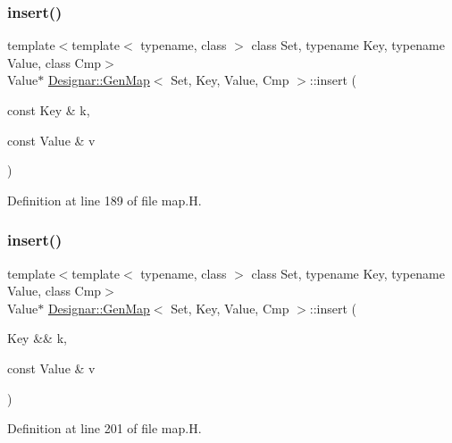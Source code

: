 \subsubsection{\texorpdfstring{insert()}{insert()}\hspace{0.1cm}{\footnotesize\ttfamily [1/4]}}
{\footnotesize\ttfamily template$<$template$<$ typename, class $>$ class Set, typename Key, typename Value, class Cmp$>$ \\
Value$\ast$ \hyperlink{class_designar_1_1_gen_map}{Designar\+::\+Gen\+Map}$<$ Set, Key, Value, Cmp $>$\+::insert (\begin{DoxyParamCaption}\item[{const Key \&}]{k,  }\item[{const Value \&}]{v }\end{DoxyParamCaption})\hspace{0.3cm}{\ttfamily [inline]}}



Definition at line 189 of file map.\+H.

\mbox{\label{class_designar_1_1_gen_map_aabd1f531f63985a2eabbeea49d90156e}} 
\subsubsection{\texorpdfstring{insert()}{insert()}\hspace{0.1cm}{\footnotesize\ttfamily [2/4]}}
{\footnotesize\ttfamily template$<$template$<$ typename, class $>$ class Set, typename Key, typename Value, class Cmp$>$ \\
Value$\ast$ \hyperlink{class_designar_1_1_gen_map}{Designar\+::\+Gen\+Map}$<$ Set, Key, Value, Cmp $>$\+::insert (\begin{DoxyParamCaption}\item[{Key \&\&}]{k,  }\item[{const Value \&}]{v }\end{DoxyParamCaption})\hspace{0.3cm}{\ttfamily [inline]}}



Definition at line 201 of file map.\+H.

\mbox{\label{class_designar_1_1_gen_map_a8fc2565be30a92687eea7f752b289751}} 
